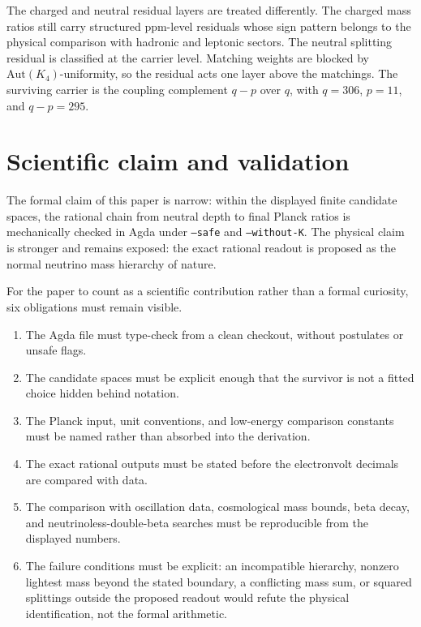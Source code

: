 \documentclass[11pt]{article}
\begin{document}
The charged and neutral residual layers are treated differently.  The charged
mass ratios still carry structured ppm-level residuals whose sign pattern
belongs to the physical comparison with hadronic and leptonic sectors.  The
neutral splitting residual is classified at the carrier level.  Matching
weights are blocked by $\mathrm{Aut}(K_4)$-uniformity, so the residual acts
one layer above the matchings.  The surviving carrier is the coupling
complement $q-p$ over $q$, with $q=306$, $p=11$, and $q-p=295$.

\section*{Scientific claim and validation}

The formal claim of this paper is narrow: within the displayed finite
candidate spaces, the rational chain from neutral depth to final Planck
ratios is mechanically checked in Agda under \texttt{--safe} and
\texttt{--without-K}.  The physical claim is stronger and remains exposed:
the exact rational readout is proposed as the normal neutrino mass hierarchy
of nature.

For the paper to count as a scientific contribution rather than a formal
curiosity, six obligations must remain visible.

\begin{enumerate}
\item The Agda file must type-check from a clean checkout, without postulates
  or unsafe flags.
\item The candidate spaces must be explicit enough that the survivor is not a
  fitted choice hidden behind notation.
\item The Planck input, unit conventions, and low-energy comparison constants
  must be named rather than absorbed into the derivation.
\item The exact rational outputs must be stated before the electronvolt
  decimals are compared with data.
\item The comparison with oscillation data, cosmological mass bounds, beta
  decay, and neutrinoless-double-beta searches must be reproducible from the
  displayed numbers.
\item The failure conditions must be explicit: an incompatible hierarchy,
  nonzero lightest mass beyond the stated boundary, a conflicting mass sum, or
  squared splittings outside the proposed readout would refute the physical
  identification, not the formal arithmetic.
\end{enumerate}
\end{document}
